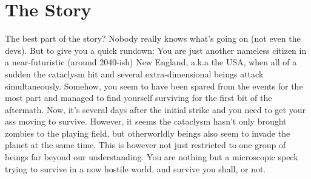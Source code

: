 \chapter{The Story}

The best part of the story? Nobody really knows what's going on (not even the devs). But to give you a quick rundown: You are just another nameless citizen in a near-futuristic (around 2040-ish) New England, a.k.a the USA, when all of a sudden the cataclysm hit and several extra-dimensional beings attack simultaneously. Somehow, you seem to have been spared from the events for the most part and managed to find yourself surviving for the first bit of the aftermath. Now, it's several days after the initial strike and you need to get your ass moving to survive. However, it seems the cataclysm hasn't only brought zombies to the playing field, but otherworldly beings also seem to invade the planet at the same time. This is however not just restricted to one group of beings far beyond our understanding. You are nothing but a microscopic speck trying to survive in a now hostile world, and survive you shall, or not.